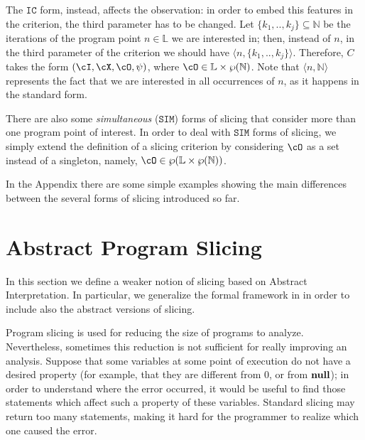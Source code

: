 \documentclass[prodmode,acmtocl]{acmsmall}
\def\lnums{\ensuremath{\mathbb{L}}\xspace}
\def\crit{\ensuremath{C}\xspace}
\def\IC{\ensuremath{\mathtt{IC}}\xspace}
\def\SIM{\ensuremath{\mathtt{SIM}}\xspace}
\newcommand{\nil}{\mbox{\bf null}}
\def\tuple#1{\langle #1 \rangle}
\newcommand{\0}{\mbox{\bf 0}}
\def\NATURALS{\mathbb{N}}
\begin{document}
The $\IC$ form, instead, affects the observation: in order to embed
this features in the criterion, the third parameter has to be changed.
Let $\{ k_1,..,k_j \} \subseteq \NATURALS$ be the iterations of the
program point $n \in \lnums$ we are interested in; then, instead of
$n$, in the third parameter of the criterion we should have
$\tuple{n,\{ k_1,..,k_j \}}$.  Therefore, $\crit$ takes the form
$(\cI,\cX,\cO,\psi)$, where $\cO \in \lnums \times \wp(\NATURALS)$.
Note that $\tuple{n,\NATURALS}$ represents the fact that we are
interested in all occurrences of $n$, as it happens in the standard
form.

There are also some \emph{simultaneous} ($\SIM$) forms of slicing that
consider more than one program point of interest.  In order to deal
with $\SIM$ forms of slicing, we simply extend the definition of a
slicing criterion by considering $\cO$ as a set instead of a
singleton, namely, $\cO \in \wp(\lnums \times \wp(\NATURALS))$.

In the Appendix there are some simple examples showing the main
differences between the several forms of slicing introduced so far.


\section{Abstract Program Slicing}
\label{section:AbstractProgramSlicing}
In this section we define a weaker notion of slicing based on Abstract
Interpretation.  In particular, we generalize the formal framework in
\cite{AForm} in order to include also the abstract versions of
slicing.

Program slicing is used for reducing the size of programs to analyze.
Nevertheless, sometimes this reduction is not sufficient for really
improving an analysis.  Suppose that some variables at some point of
execution do not have a desired property (for example, that they are
different from $0$, or from $\nil$); in order to understand where the
error occurred, it would be useful to find those statements which
affect such a property of these variables.  Standard slicing may
return too many statements, making it hard for the programmer to
realize which one caused the error.
\end{document}
